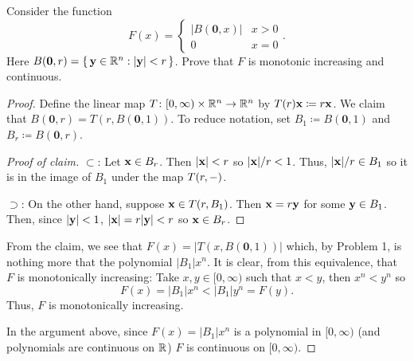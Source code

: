 \begin{problem}
Consider the function
\[
F(x)=
\begin{cases}
|B(\mathbf{0},x)|&x>0\\
0&x=0
\end{cases}.
\]
Here
$B(\mathbf{0},r)=\left\{\,\mathbf{y}\in\mathbb{R}^n:|\mathbf{y}|<r\,\right\}$. Prove
that $F$ is monotonic increasing and continuous.
\end{problem}
\begin{proof}
Define the linear map $T\colon[0,\infty)\times\mathbb{R}^n\to\mathbb{R}^n$ by
$T(r)\mathbf{x}\coloneqq r\mathbf{x}$. We claim that
$B(\mathbf{0},r)=T(r,B(\mathbf{0},1))$. To reduce notation, set
$B_1\coloneqq B(\mathbf{0},1)$ and $B_r\coloneqq B(\mathbf{0},r)$.
\begin{proof}[Proof of claim]
\renewcommand{\qedsymbol}{$\clubsuit$}
$\subset$: Let $\mathbf{x}\in B_r$. Then $|\mathbf{x}|<r$ so $|\mathbf{x}|/r<1$. Thus,
$|\mathbf{x}|/r\in B_1$ so it is in the image of $B_1$ under the map
$T(r,{-})$.

$\supset$: On the other hand, suppose $\mathbf{x}\in T(r,B_1)$. Then
$\mathbf{x}=r\mathbf{y}$ for some $\mathbf{y}\in B_1$. Then, since $|\mathbf{y}|<1$,
$|\mathbf{x}|=r|\mathbf{y}|<r$ so $\mathbf{x}\in B_r$.
\end{proof}

From the claim, we see that $F(x)=|T(x,B(\mathbf{0},1))|$ which, by Problem
1, is nothing more that the polynomial $|B_1|x^n$. It is clear,
from this equivalence, that $F$ is monotonically increasing: Take
$x,y\in[0,\infty)$ such that $x<y$, then $x^n<y^n$ so
\begin{equation}
\label{eq:sp16:1:7}
F(x)=|B_1|x^n<|B_1|y^n=F(y).
\end{equation}
Thus, $F$ is monotonically increasing.

In the argument above, since $F(x)=|B_1|x^n$ is a polynomial in
$[0,\infty)$ (and polynomials are continuous on $\mathbb{R}$) $F$ is continuous
on $[0,\infty)$.
\end{proof}

